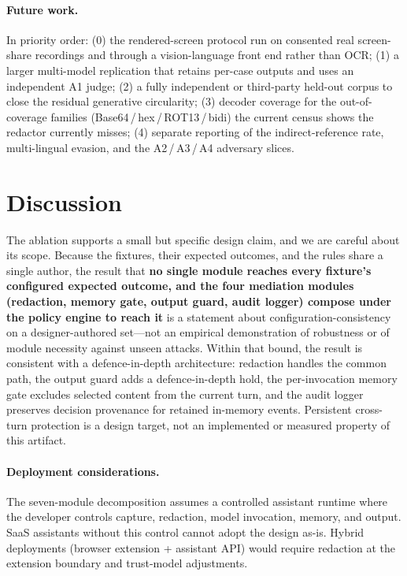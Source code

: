 \documentclass[pdflatex,sn-mathphys-num]{sn-jnl}
\begin{document}
\paragraph{Future work.}
In priority order: (0) the rendered-screen protocol run on consented real
screen-share recordings and through a vision-language front end rather than
OCR; (1) a larger multi-model replication that retains per-case
outputs and uses an independent A1 judge; (2) a fully independent or third-party
held-out corpus to close the residual generative circularity; (3) decoder coverage for the
out-of-coverage families (Base64\,/\,hex\,/\,ROT13\,/\,bidi) the current census
shows the redactor currently misses; (4) separate reporting of the
indirect-reference rate, multi-lingual evasion, and the A2\,/\,A3\,/\,A4 adversary
slices.

\section{Discussion}\label{sec:discussion}

The ablation supports a small but specific design claim, and we are careful
about its scope. Because the fixtures, their expected outcomes, and the rules
share a single author, the result that \textbf{no single module reaches every
fixture's configured expected outcome, and the four mediation modules
(redaction, memory gate, output guard, audit logger) compose under the policy
engine to reach it} is a statement about configuration-consistency on a
designer-authored set---not an empirical demonstration of robustness or of
module necessity against unseen attacks.
Within that bound, the result is consistent with a defence-in-depth
architecture: redaction handles the common path, the output guard adds a
defence-in-depth hold, the per-invocation memory gate excludes selected content
from the current turn, and the audit logger preserves decision provenance for
retained in-memory events. Persistent cross-turn protection is a design target,
not an implemented or measured property of this artifact.

\paragraph{Deployment considerations.}
The seven-module decomposition assumes a controlled assistant runtime where the
developer controls capture, redaction, model invocation, memory, and output.
SaaS assistants without this control cannot adopt the design as-is. Hybrid
deployments (browser extension + assistant API) would require redaction at the
extension boundary and trust-model adjustments.
\end{document}

